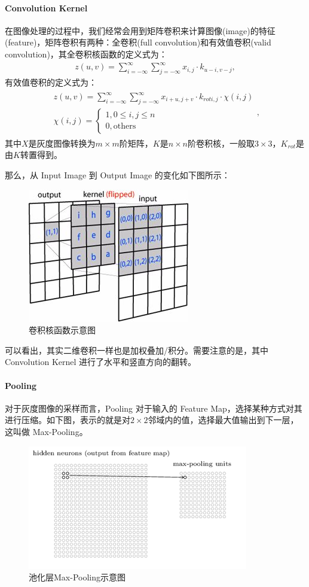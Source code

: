 \documentclass{whutmod}
\begin{document}
			\paragraph{Convolution Kernel} 在图像处理的过程中，我们经常会用到矩阵卷积来计算图像(image)的特征(feature)，矩阵卷积有两种：全卷积(full convolution)和有效值卷积(valid convolution)，其全卷积核函数的定义式为：
			     \begin{gather}
z(u, v)=\sum_{i=-\infty}^{\infty} \sum_{j=-\infty}^{\infty} x_{i, j} \cdot k_{u-i, v-j},
			     \end{gather}
			有效值卷积的定义式为：
			\begin{gather}
\begin{array}{c}
z(u, v)=\sum_{i=-\infty}^{\infty} \sum_{j=-\infty}^{\infty} x_{i+u, j+v} \cdot k_{r o t i, j} \cdot \chi(i, j) \\
\chi(i, j)=\left\{  
\begin{array}{c}
1,0 \leqslant i, j \leqslant n \\
0, \text {others}
\end{array}
\right.  
\end{array},
			\end{gather}
			其中$X$是灰度图像转换为$m\times m$阶矩阵，$K$是$n\times n$阶卷积核，一般取$3\times 3$，$K_{rot}$是由$K$转置得到。
			
		那么，从 Input Image 到 Output Image 的变化如下图所示：
		\begin{figure}[H]
			\centering
			\includegraphics[width=.5\textwidth]{figures/cnn.jpg}
			\caption{卷积核函数示意图}
		\end{figure}
		可以看出，其实二维卷积一样也是加权叠加/积分。需要注意的是，其中 Convolution Kernel 进行了水平和竖直方向的翻转。
		
			\paragraph{Pooling} 对于灰度图像的采样而言，Pooling 对于输入的 Feature Map，选择某种方式对其进行压缩。如下图，表示的就是对$2\times 2$邻域内的值，选择最大值输出到下一层，这叫做 Max-Pooling。
				\begin{figure}[H]
			\centering
			\includegraphics[width=.5\textwidth]{figures/pool.png}
			\caption{池化层Max-Pooling示意图}
		\end{figure}
	
\end{document}
